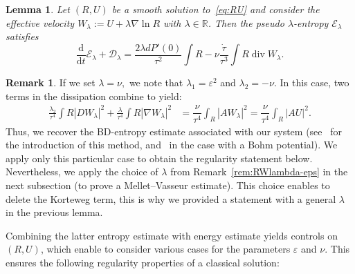 \documentclass[10pt]{amsart}
\newtheorem{lemm}[theo]{Lemma}\newtheorem{prop}[theo]{Proposition}\newtheorem{coro}[theo]{Corollary}\newtheorem{conj}[theo]{Conjecture}
\theoremstyle{definition}\newtheorem{defi}[theo]{Definition}\newtheorem{rema}[theo]{Remark}\newtheorem{exam}[theo]{Example}\newtheorem{exem}[theo]{Example}\newtheorem{nota}[theo]{Notation}
\DeclareMathOperator{\DIV}{div}
\newcommand*\dd {\mathrm{d}}
\newcommand*\<{\left\langle}
\renewcommand*\>{\right\rangle}
\begin{document}
\begin{lemm}\label{lem:pseudo-lambda-entropy}
Let $(R,U)$ be a smooth solution to~\eqref{eq:RU} and consider the effective velocity $W_\lambda := U + \lambda \nabla \ln R$ with $\lambda \in \mathbb R$. Then the pseudo $\lambda$-entropy $\mathcal E_{\lambda}$ satisfies
\[
\frac{\dd }{\dd t} \mathcal E_{\lambda} + \mathcal D_{\lambda} = \frac{2 \lambda d P'(0)}{\tau^2} \int R - \nu \frac{\dot \tau}{\tau^3} \int R \DIV W_\lambda.
\]
\end{lemm}

\begin{rema}
If we set $\lambda = \nu,$ we note that $\lambda_1 = \varepsilon^2$ and $\lambda_2=-\nu.$ In this case, two terms in the dissipation combine to yield:
\[
\begin{aligned}
\frac{\lambda_2}{\tau^4} \int R |D W_\lambda|^2 +
\frac{\lambda}{\tau^4} \int R |\nabla W_\lambda|^2 & = \dfrac{\nu}{\tau^4} \int_{R} |A W_{\lambda}|^2 = \dfrac{\nu}{\tau^4} \int_{R} |A U|^2.
\end{aligned}
\]
Thus, we recover the BD-entropy estimate associated with our system (see~\cite{BD04,Bre-De-CKL-03} for the introduction of this method, and~\cite{VasseurYu} in the case with a Bohm potential). We apply only this particular case to obtain the regularity statement below. Nevertheless, we apply the choice of $\lambda$ from Remark~\ref{rem:RWlambda-eps} in the next subsection (to prove a Mellet--Vasseur estimate). This choice enables to delete the Korteweg term, this is why we provided a statement with a general $\lambda$ in the previous lemma.
\end{rema}

Combining the latter entropy estimate with energy estimate yields controls on $(R,U)$, which enable to consider various cases for the parameters $\varepsilon$ and $\nu.$ This ensures the following regularity properties of a classical solution:
\end{document}
